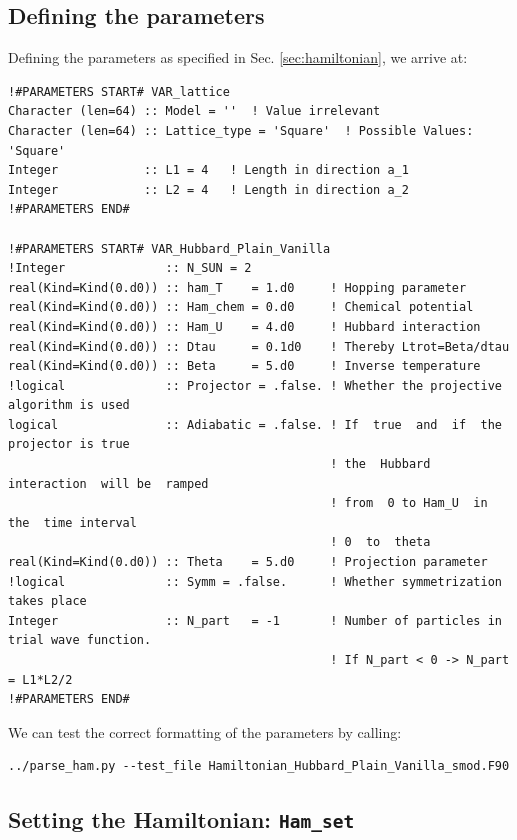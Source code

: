 \subsection{Defining the parameters}
Defining the parameters as specified in Sec. \ref{sec:hamiltonian}, we arrive at:

\begin{lstlisting}[style=fortran]
!#PARAMETERS START# VAR_lattice
Character (len=64) :: Model = ''  ! Value irrelevant
Character (len=64) :: Lattice_type = 'Square'  ! Possible Values: 'Square'
Integer            :: L1 = 4   ! Length in direction a_1
Integer            :: L2 = 4   ! Length in direction a_2
!#PARAMETERS END#

!#PARAMETERS START# VAR_Hubbard_Plain_Vanilla
!Integer              :: N_SUN = 2
real(Kind=Kind(0.d0)) :: ham_T    = 1.d0     ! Hopping parameter
real(Kind=Kind(0.d0)) :: Ham_chem = 0.d0     ! Chemical potential
real(Kind=Kind(0.d0)) :: Ham_U    = 4.d0     ! Hubbard interaction
real(Kind=Kind(0.d0)) :: Dtau     = 0.1d0    ! Thereby Ltrot=Beta/dtau
real(Kind=Kind(0.d0)) :: Beta     = 5.d0     ! Inverse temperature
!logical              :: Projector = .false. ! Whether the projective algorithm is used
logical               :: Adiabatic = .false. ! If  true  and  if  the  projector is true  
                                             ! the  Hubbard interaction  will be  ramped 
                                             ! from  0 to Ham_U  in the  time interval 
                                             ! 0  to  theta
real(Kind=Kind(0.d0)) :: Theta    = 5.d0     ! Projection parameter
!logical              :: Symm = .false.      ! Whether symmetrization takes place
Integer               :: N_part   = -1       ! Number of particles in trial wave function.
                                             ! If N_part < 0 -> N_part = L1*L2/2
!#PARAMETERS END#
\end{lstlisting}
We can test the correct formatting of the parameters by calling:
\begin{lstlisting}[style=bash]
../parse_ham.py --test_file Hamiltonian_Hubbard_Plain_Vanilla_smod.F90
\end{lstlisting}

\subsection{Setting the Hamiltonian:  \texttt{Ham\_set} }

